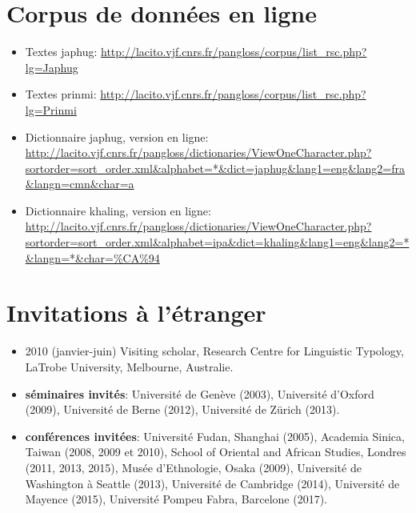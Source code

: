 \documentclass[oldfontcommands,oneside,a4paper,11pt]{article}
\begin{document}
\section*{Corpus de données en ligne}
\begin{itemize}
\item Textes japhug: \url{http://lacito.vjf.cnrs.fr/pangloss/corpus/list_rsc.php?lg=Japhug}
\item Textes prinmi: \url{http://lacito.vjf.cnrs.fr/pangloss/corpus/list_rsc.php?lg=Prinmi}
\item Dictionnaire japhug, version en ligne: \url{http://lacito.vjf.cnrs.fr/pangloss/dictionaries/ViewOneCharacter.php?sortorder=sort_order.xml&alphabet=*&dict=japhug&lang1=eng&lang2=fra&langn=cmn&char=a}
\item Dictionnaire khaling, version en ligne: \url{http://lacito.vjf.cnrs.fr/pangloss/dictionaries/ViewOneCharacter.php?sortorder=sort_order.xml&alphabet=ipa&dict=khaling&lang1=eng&lang2=*&langn=*&char=\%CA\%94}
\end{itemize}
  
 
  
\section*{Invitations à l'étranger}
\begin{itemize}
\item   2010 (janvier-juin) Visiting scholar, Research Centre for Linguistic Typology, LaTrobe University, Melbourne, Australie.
 \item   \textbf{séminaires invités}:  Université de Genève (2003),  Université d'Oxford (2009), Université de Berne (2012),  Université de Zürich (2013).
 \item \textbf{conférences invitées}: Université Fudan, Shanghai (2005), Academia Sinica, Taiwan (2008, 2009 et 2010), School of Oriental and African Studies, Londres (2011, 2013, 2015), Musée d'Ethnologie, Osaka (2009), Université de Washington à Seattle (2013),  Université de Cambridge (2014), Université de Mayence (2015),  Université Pompeu Fabra, Barcelone (2017).
  \end{itemize}
    
\end{document}
